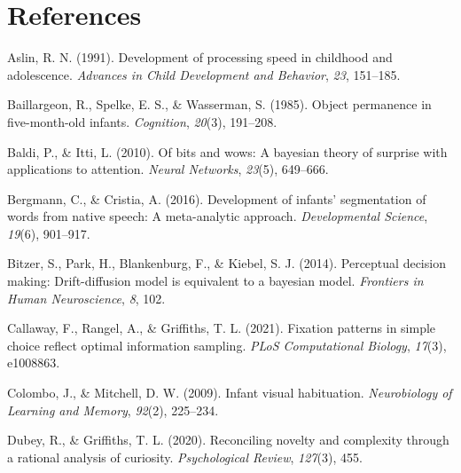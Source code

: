 \documentclass[10pt, letterpaper]{article}
\newenvironment{CSLReferences}%
  {}%
  {\par}
\begin{document}
\hypertarget{references}{%
\section{References}\label{references}}

\setlength{\parindent}{-0.1in} 
\setlength{\leftskip}{0.125in}

\noindent

\hypertarget{refs}{}
\begin{CSLReferences}{1}{0}
\leavevmode{}%
Aslin, R. N. (1991). Development of processing speed in childhood and
adolescence. \emph{Advances in Child Development and Behavior},
\emph{23}, 151--185.

\leavevmode{}%
Baillargeon, R., Spelke, E. S., \& Wasserman, S. (1985). Object
permanence in five-month-old infants. \emph{Cognition}, \emph{20}(3),
191--208.

\leavevmode{}%
Baldi, P., \& Itti, L. (2010). Of bits and wows: A bayesian theory of
surprise with applications to attention. \emph{Neural Networks},
\emph{23}(5), 649--666.

\leavevmode{}%
Bergmann, C., \& Cristia, A. (2016). Development of infants'
segmentation of words from native speech: A meta-analytic approach.
\emph{Developmental Science}, \emph{19}(6), 901--917.

\leavevmode{}%
Bitzer, S., Park, H., Blankenburg, F., \& Kiebel, S. J. (2014).
Perceptual decision making: Drift-diffusion model is equivalent to a
bayesian model. \emph{Frontiers in Human Neuroscience}, \emph{8}, 102.

\leavevmode{}%
Callaway, F., Rangel, A., \& Griffiths, T. L. (2021). Fixation patterns
in simple choice reflect optimal information sampling. \emph{PLoS
Computational Biology}, \emph{17}(3), e1008863.

\leavevmode{}%
Colombo, J., \& Mitchell, D. W. (2009). Infant visual habituation.
\emph{Neurobiology of Learning and Memory}, \emph{92}(2), 225--234.

\leavevmode{}%
Dubey, R., \& Griffiths, T. L. (2020). Reconciling novelty and
complexity through a rational analysis of curiosity. \emph{Psychological
Review}, \emph{127}(3), 455.


\end{CSLReferences}
\end{document}
